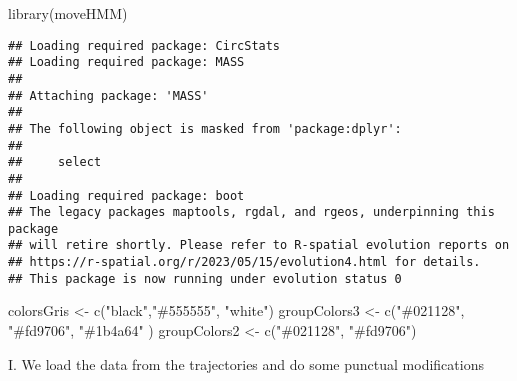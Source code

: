 \documentclass[
]{article}
\newenvironment{Shaded}{\begin{snugshade}}{\end{snugshade}}
\newcommand{\FunctionTok}[1]{\textcolor[rgb]{0.00,0.00,0.00}{#1}}
\newcommand{\NormalTok}[1]{#1}
\newcommand{\OtherTok}[1]{\textcolor[rgb]{0.56,0.35,0.01}{#1}}
\newcommand{\StringTok}[1]{\textcolor[rgb]{0.31,0.60,0.02}{#1}}
\begin{document}
\begin{Shaded}
\begin{Highlighting}[]
\FunctionTok{library}\NormalTok{(moveHMM)}
\end{Highlighting}
\end{Shaded}

\begin{verbatim}
## Loading required package: CircStats
## Loading required package: MASS
## 
## Attaching package: 'MASS'
## 
## The following object is masked from 'package:dplyr':
## 
##     select
## 
## Loading required package: boot
## The legacy packages maptools, rgdal, and rgeos, underpinning this package
## will retire shortly. Please refer to R-spatial evolution reports on
## https://r-spatial.org/r/2023/05/15/evolution4.html for details.
## This package is now running under evolution status 0
\end{verbatim}

\begin{Shaded}
\begin{Highlighting}[]
\NormalTok{colorsGris }\OtherTok{\textless{}{-}} \FunctionTok{c}\NormalTok{(}\StringTok{"black"}\NormalTok{,}\StringTok{"\#555555"}\NormalTok{, }\StringTok{"white"}\NormalTok{)}
\NormalTok{groupColors3 }\OtherTok{\textless{}{-}} \FunctionTok{c}\NormalTok{(}\StringTok{"\#021128"}\NormalTok{, }\StringTok{"\#fd9706"}\NormalTok{, }\StringTok{"\#1b4a64"}\NormalTok{ )}
\NormalTok{groupColors2 }\OtherTok{\textless{}{-}} \FunctionTok{c}\NormalTok{(}\StringTok{"\#021128"}\NormalTok{, }\StringTok{"\#fd9706"}\NormalTok{)}
\end{Highlighting}
\end{Shaded}

I. We load the data from the trajectories and do some punctual
modifications
\end{document}
